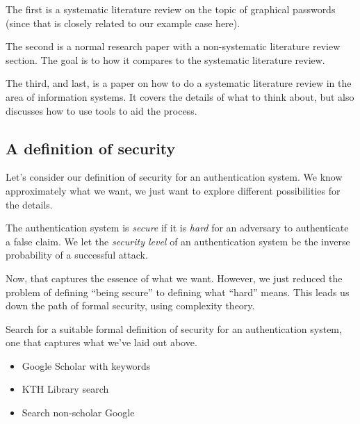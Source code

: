 The first\autocite{GraphicalPasswordsSurvey} is a systematic literature review 
on the topic of graphical passwords (since that is closely related to our 
example case here).

The second\autocite{OfPasswordsAndPeople} is a normal research paper with a 
non-systematic literature review section.
The goal is to how it compares to the systematic literature review.

The third, and last, is a paper on how to do a systematic literature review in 
the area of information systems\autocite{SLRinIS}.
It covers the details of what to think about, but also discusses how to use 
tools to aid the process.

\subsection{A definition of security}

Let's consider our definition of security for an authentication system.
We know approximately what we want, we just want to explore different 
possibilities for the details.

\begin{frame}
\begin{definition}
  The authentication system is \emph{secure} if it is \emph{hard} for an 
  adversary to authenticate a false claim.
  We let the \emph{security level} of an authentication system be the inverse 
  probability of a successful attack.
\end{definition}
\end{frame}

Now, that captures the essence of what we want.
However, we just reduced the problem of defining \enquote{being secure} to 
defining what \enquote{hard} means.
This leads us down the path of formal security, \eg using complexity theory.

\begin{frame}
\begin{exercise}
  Search for a suitable formal definition of security for an authentication 
  system, one that captures what we've laid out above.
\end{exercise}

\begin{example}
  \begin{itemize}
    \item Google Scholar with keywords
    \item KTH Library search
    \item Search non-scholar Google
  \end{itemize}
\end{example}
\end{frame}

